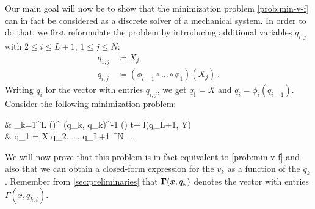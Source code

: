 Our main goal will now be to show that the minimization problem \ref{prob:min-v-f} can in fact be considered as a discrete solver of a mechanical system.
In order to do that, we first reformulate the problem by introducing additional variables $q_{i,j}$ with $2 \leq i \leq L+1$, $1 \leq j \leq N$:
\begin{align}
	q_{1, j} &\coloneqq X_j \, \\
	q_{i, j} &\coloneqq (\phi_{i-1} \circ \ldots \circ \phi_1) (X_j) \ .
\end{align}
Writing $q_i$ for the vector with entries $q_{i,j}$, we get $q_1 = X$ and $q_i = \phi_i(q_{i-1})$.
Consider the following minimization problem:
\begin{problem}
	\label{prob:min-q}
	\begin{cases}
		 & \nu \cdot {} \sum_{k=1}^{L} \left(\right)^ \bGamma(q_k, q_k)^{-1} \left(\right) \Delta t+ l(q_{L+1}, Y) \\
		 & q_1 = X  q_2, \ldots, q_{L+1} \in \cX^N \ .
	\end{cases}
\end{problem}
We will now prove that this problem is in fact equivalent to \cref{prob:min-v-f} and also that we can obtain a closed-form expression for the $v_k$ as a function of the $q_k$.
Remember from \cref{sec:preliminaries} that $\mathbf{\Gamma}(x, q_k)$ denotes the vector with entries $\Gamma(x, q_{k,i})$.

